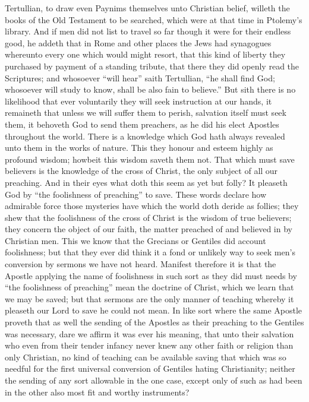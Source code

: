 Tertullian, to draw even Paynims themselves unto Christian belief, willeth the books of the Old Testament to be searched, which were at that time in Ptolemy’s library. And if men did not list to travel so far though it were for their endless good, he addeth that in Rome and other places the Jews had synagogues whereunto every one which would might resort, that this kind of liberty they purchased by payment of a standing tribute, that there they did openly read the Scriptures; and whosoever “will hear” saith Tertullian, “he shall find God; whosoever will study to  know, shall be also fain to believe.” But sith there is no likelihood that ever voluntarily they will seek instruction at our hands, it remaineth that unless we will suffer them to perish, salvation itself must seek them, it behoveth God to send them preachers, as he did his elect Apostles throughout the world.
There is a knowledge which God hath always revealed unto them in the works of nature. This they honour and esteem highly as profound wisdom; howbeit this wisdom saveth them not. That which must save believers is the knowledge of the cross of Christ, the only subject of all our preaching. And in their eyes what doth this seem as yet but folly? It pleaseth God by “the foolishness of preaching” to save. These words declare how admirable force those mysteries have which the world doth deride as follies; they shew that the foolishness of the cross of Christ is the wisdom of true believers; they concern the object of our faith, the matter preached of and believed in by Christian men. This we know that the Grecians or Gentiles did account foolishness; but that they ever did think it a fond or unlikely way to seek men’s conversion by sermons we have not heard. Manifest therefore it is that the Apostle applying the name of foolishness in such sort as they did must needs by “the foolishness of preaching” mean the doctrine of Christ, which we learn that we may be saved; but that sermons are the only manner of teaching whereby it pleaseth our Lord to save he could not mean.
In like sort where the same Apostle proveth that as well the sending of the Apostles as their preaching to the Gentiles was necessary, dare we affirm it was ever his meaning, that unto their salvation who even from their tender infancy never knew any other faith or religion than only Christian, no kind of teaching can be available saving that which was so needful for the first universal conversion of Gentiles hating Christianity; neither the sending of any sort allowable in the one case, except only of such as had been in the other also most fit and worthy instruments?
